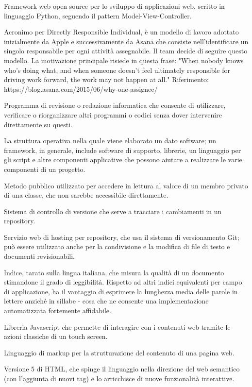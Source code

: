 \item[Django] Framework web open source per lo sviluppo di applicazioni web, scritto in linguaggio Python, seguendo il pattern Model-View-Controller.
\item[DRI] Acronimo per Directly Responsible Individual, è un modello di lavoro adottato inizialmente da Apple e successivamente da Asana che consiste nell'identificare un singolo responsabile per ogni attività assegnabile. Il team decide di seguire questo modello. La motivazione principale risiede in questa frase: "When nobody knows who’s doing what, and when someone doesn’t feel ultimately responsible for driving work forward, the work may not happen at all." Riferimento: https://blog.asana.com/2015/06/why-one-assignee/ 
\item[editor] Programma di revisione o redazione informatica che consente di utilizzare, verificare o riorganizzare altri programmi o codici senza dover intervenire direttamente su questi.
\item[framework]  La struttura operativa nella quale viene elaborato un dato software; un framework, in generale, include software di supporto, librerie, un linguaggio per gli script e altre componenti applicative che possono aiutare a realizzare le varie componenti di un progetto.
\item[getter] Metodo pubblico utilizzato per accedere in lettura al valore di un membro privato di una classe, che non sarebbe accessibile direttamente.
\item[Git] Sistema di controllo di versione che serve a tracciare i cambiamenti in un repository.
\item[GitHub] Servizio web di hosting per repository, che usa il sistema di versionamento Git; può essere utilizzato anche per la condivisione e la modifica di file di testo e documenti revisionabili.
\item[Gulpease, indice di] Indice, tarato sulla lingua italiana, che misura la qualità di un documento stimandone il grado di leggibilità. Rispetto ad altri indici equivalenti per campo di applicazione, ha il vantaggio di esprimere la lunghezza media delle parole in lettere anziché in sillabe - cosa che ne consente una implementazione automatizzata fortemente affidabile. 
\item[Hammer.js] Libreria Javascript che permette di interagire con i contenuti web tramite le azioni classiche di un touch screen.
\item[HTML] Linguaggio di markup per la strutturazione del contenuto di una pagina web.
\item[HTML5] Versione 5 di HTML, che spinge il linguaggio nella direzione del web semantico (con l'aggiunta di nuovi tag) e lo arricchisce di nuove funzionalità interattive.
